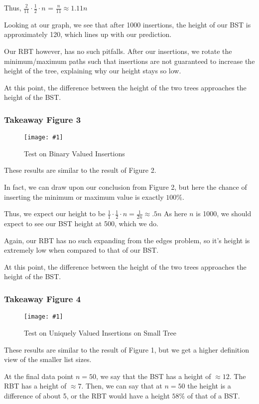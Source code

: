 \documentclass{article}
\newcommand{\figureInsetScaled}[3]
{
    \FloatBarrier{}
    \figureRaw{#1}{#2}{#3}
    \FloatBarrier{}
}
\newcommand{\figureRaw}[3]
{
    \begin{figure}[ht!]
        \centering
        \texttt{[image: \#1]}
        \caption{#2}
    \end{figure}
}
\begin{document}
Thus, $\frac{2}{11} \cdot \frac{1}{2} \cdot n$ = $\frac{n}{11} \approx 1.11n$ 

Looking at our graph, we see that after 1000 insertions, the height of our BST is approximately 120, which lines up with our prediction.

Our RBT however, has no such pitfalls. After our insertions, we rotate the minimum/maximum paths such that insertions are not guaranteed to increase the height of the tree, explaining why our height stays so low.

At this point, the difference between the height of the two trees approaches the height of the BST.

\subsubsection{Takeaway Figure 3}
\figureInsetScaled{images/experiment1/Figure_3.png}{Test on Binary Valued Insertions}{0.5}

These results are similar to the result of Figure 2.

In fact, we can draw upon our conclusion from Figure 2, but here the chance of inserting the minimum or maximum value is exactly $100\%$.

Thus, we expect our height to be $\frac{1}{1} \cdot \frac{1}{2} \cdot n = \frac{1}{2n} \approx .5n$ As here $n$ is 1000, we should expect to see our BST height at 500, which we do.

Again, our RBT has no such expanding from the edges problem, so it's height is extremely low when compared to that of our BST.

At this point, the difference between the height of the two trees approaches the height of the BST.

\subsubsection{Takeaway Figure 4}
\figureInsetScaled{images/experiment1/Figure_4.png}{Test on Uniquely Valued Insertions on Small Tree}{0.5}

These results are similar to the result of Figure 1, but we get a higher definition view of the smaller list sizes.

At the final data point $n=50$, we say that the BST has a height of $\approx12$. The RBT has a height of $\approx 7$. Then, we can say that at $n=50$ the height is a difference of about 5, or the RBT would have a height $58\%$ of that of a BST.
\end{document}

